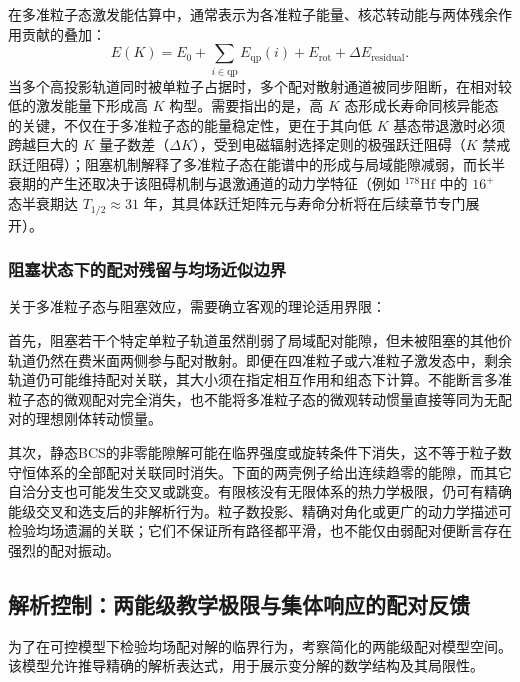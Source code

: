在多准粒子态激发能估算中，通常表示为各准粒子能量、核芯转动能与两体残余作用贡献的叠加\cite{book-jain-nuclear-isomers}：
\begin{equation}\label{eq:2-3-34}
E(K) = E_0 + \sum_{i\in\mathrm{qp}} E_{\mathrm{qp}}(i) + E_{\mathrm{rot}} + \Delta E_{\mathrm{residual}}.
\end{equation}
当多个高投影轨道同时被单粒子占据时，多个配对散射通道被同步阻断，在相对较低的激发能量下形成高 $K$ 构型。需要指出的是，高 $K$ 态形成长寿命同核异能态的关键，不仅在于多准粒子态的能量稳定性，更在于其向低 $K$ 基态带退激时必须跨越巨大的 $K$ 量子数差（$\Delta K$），受到电磁辐射选择定则的极强跃迁阻碍（$K$ 禁戒跃迁阻碍）；阻塞机制解释了多准粒子态在能谱中的形成与局域能隙减弱，而长半衰期的产生还取决于该阻碍机制与退激通道的动力学特征（例如 $^{178}\mathrm{Hf}$ 中的 $16^+$ 态半衰期达 $T_{1/2} \approx 31\text{ 年}$，其具体跃迁矩阵元与寿命分析将在后续章节专门展开）。


\subsubsection{阻塞状态下的配对残留与均场近似边界}\label{sec:2-3-阻塞状态下的配对残留与均场近似边界}


关于多准粒子态与阻塞效应，需要确立客观的理论适用界限：

首先，阻塞若干个特定单粒子轨道虽然削弱了局域配对能隙，但未被阻塞的其他价轨道仍然在费米面两侧参与配对散射。即便在四准粒子或六准粒子激发态中，剩余轨道仍可能维持配对关联，其大小须在指定相互作用和组态下计算。不能断言多准粒子态的微观配对完全消失，也不能将多准粒子态的微观转动惯量直接等同为无配对的理想刚体转动惯量。

其次，静态BCS的非零能隙解可能在临界强度或旋转条件下消失，这不等于粒子数守恒体系的全部配对关联同时消失。下面的两壳例子给出连续趋零的能隙，而其它自洽分支也可能发生交叉或跳变。有限核没有无限体系的热力学极限，仍可有精确能级交叉和选支后的非解析行为。粒子数投影、精确对角化或更广的动力学描述可检验均场遗漏的关联；它们不保证所有路径都平滑，也不能仅由弱配对便断言存在强烈的配对振动。



\subsection{解析控制：两能级教学极限与集体响应的配对反馈}\label{sec:2-3-5}


为了在可控模型下检验均场配对解的临界行为，考察简化的两能级配对模型空间。该模型允许推导精确的解析表达式，用于展示变分解的数学结构及其局限性。



